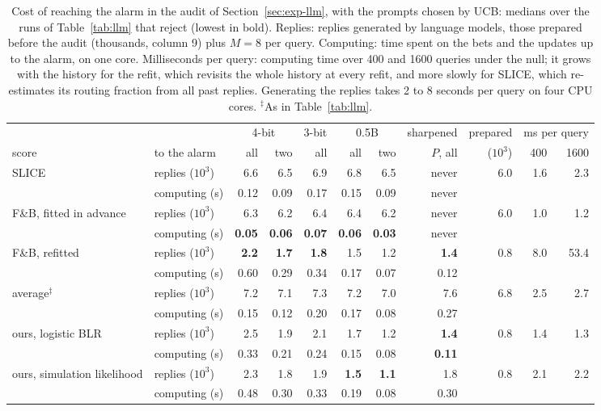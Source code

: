 \documentclass[12pt]{article}
\theoremstyle{remark}
\begin{document}
\begin{table}[t]
\centering
\caption{Cost of reaching the alarm in the audit of
Section~\ref{sec:exp-llm}, with the prompts chosen by UCB: medians over the
runs of Table~\ref{tab:llm} that reject (lowest in bold). Replies: replies
generated by language models, those prepared before the audit (thousands,
column 9) plus $M = 8$ per query. Computing: time spent on the bets and the
updates up to the alarm, on one core. Milliseconds per query: computing time
over 400 and 1600 queries under the null; it grows with the history for the
refit, which revisits the whole history at every refit, and more slowly for
SLICE, which re-estimates its routing fraction from all past replies.
Generating the replies takes 2 to 8 seconds per query on four CPU cores.
$^\ddagger$As in Table~\ref{tab:llm}.}
\label{tab:llmcost}
\small
\setlength{\tabcolsep}{4pt}
\begin{adjustbox}{max width=\textwidth}
\begin{tabular}{llrrrrrrrrr}
\toprule
 & & \multicolumn{2}{c}{4-bit} & 3-bit & \multicolumn{2}{c}{0.5B} & sharpened & prepared & \multicolumn{2}{c}{ms per query} \\
\cmidrule(lr){3-4}\cmidrule(lr){5-5}\cmidrule(lr){6-7}\cmidrule(lr){8-8}\cmidrule(lr){10-11}
score & to the alarm & all & two & all & all & two & $P$, all & ($10^3$) & 400 & 1600 \\
\midrule
SLICE & replies ($10^3$) & 6.6 & 6.5 & 6.9 & 6.8 & 6.5 & never & 6.0 & 1.6 & 2.3 \\
 & computing (s) & 0.12 & 0.09 & 0.17 & 0.15 & 0.09 & never & & & \\
\addlinespace[3pt]
F\&B, fitted in advance & replies ($10^3$) & 6.3 & 6.2 & 6.4 & 6.4 & 6.2 & never & 6.0 & 1.0 & 1.2 \\
 & computing (s) & \textbf{0.05} & \textbf{0.06} & \textbf{0.07} & \textbf{0.06} & \textbf{0.03} & never & & & \\
\addlinespace[3pt]
F\&B, refitted & replies ($10^3$) & \textbf{2.2} & \textbf{1.7} & \textbf{1.8} & 1.5 & 1.2 & \textbf{1.4} & 0.8 & 8.0 & 53.4 \\
 & computing (s) & 0.60 & 0.29 & 0.34 & 0.17 & 0.07 & 0.12 & & & \\
\addlinespace[3pt]
average$^\ddagger$ & replies ($10^3$) & 7.2 & 7.1 & 7.3 & 7.2 & 7.0 & 7.6 & 6.8 & 2.5 & 2.7 \\
 & computing (s) & 0.15 & 0.12 & 0.20 & 0.17 & 0.08 & 0.27 & & & \\
\addlinespace[3pt]
ours, logistic BLR & replies ($10^3$) & 2.5 & 1.9 & 2.1 & 1.7 & 1.2 & \textbf{1.4} & 0.8 & 1.4 & 1.3 \\
 & computing (s) & 0.33 & 0.21 & 0.24 & 0.15 & 0.08 & \textbf{0.11} & & & \\
\addlinespace[3pt]
ours, simulation likelihood & replies ($10^3$) & 2.3 & 1.8 & 1.9 & \textbf{1.5} & \textbf{1.1} & 1.8 & 0.8 & 2.1 & 2.2 \\
 & computing (s) & 0.48 & 0.30 & 0.33 & 0.19 & 0.08 & 0.30 & & & \\
\bottomrule
\end{tabular}
\end{adjustbox}
\end{table}
\end{document}
